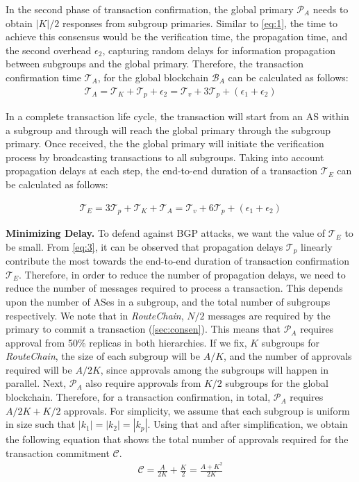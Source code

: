 \documentclass[5p]{elsarticle}
\newcommand{\BfPara}[1]{{\noindent\bf#1.}\xspace}
\newcommand{\rc}{{{\em RouteChain}}\xspace}
\begin{document}
In the second phase of transaction confirmation, the global primary $\mathcal{P}_{A}$ needs to obtain $|K|/2$ responses from subgroup primaries. Similar to \autoref{eq:1}, the time to achieve this consensus would be the verification time, the propagation time, and the second overhead $\epsilon_{2}$, capturing random delays for information propagation between subgroups and the global primary. Therefore, the transaction confirmation time $\mathcal{T}_{A}$, for the global blockchain $\mathcal{B}_{A}$ can be calculated as follows:
\begin{align}\label{eq:2}
    \mathcal{T}_{A} = \mathcal{T}_{K}+ \mathcal{T}_{p}+\epsilon_{2} = \mathcal{T}_{v} + 3\mathcal{T}_{p} + (\epsilon_{1}+\epsilon_{2})
\end{align}



In a complete transaction life cycle, the transaction will start from an AS within a subgroup and through will reach the global primary through the subgroup primary. Once received, the the global primary will initiate the verification process by broadcasting transactions to all subgroups. Taking into account propagation delays at each step, the end-to-end duration of a transaction $\mathcal{T}_{E}$ can be calculated as follows: 

\begin{align}\label{eq:3}
    \mathcal{T}_{E} = 3\mathcal{T}_{p} +\mathcal{T}_{K}+ \mathcal{T}_{A} = \mathcal{T}_{v} + 6\mathcal{T}_{p} + (\epsilon_{1}+\epsilon_{2})
\end{align}

 


\BfPara{Minimizing Delay}\label{sec:mind}
To defend against BGP attacks, we want the value of $ \mathcal{T}_{E}$ to be small. From \autoref{eq:3}, it can be observed that propagation delays  $\mathcal{T}_{p}$ linearly contribute the most towards the end-to-end duration of transaction confirmation $\mathcal{T}_{E}$. Therefore, in order to reduce the number of propagation delays, we need to reduce the number of messages required to process a transaction. This depends upon the number of ASes in a subgroup, and the total number of subgroups respectively. We note that in \rc, $N/2$ messages are required by the primary to commit a transaction (\textsection\ref{sec:consen}). This means that $\mathcal{P}_{A}$ requires approval from 50\% replicas in both hierarchies. If we fix, $K$ subgroups for \rc, the size of each subgroup will be $A/K$, and the number of approvals required will be $A/2K$, since approvals among the subgroups will happen in parallel. Next, $\mathcal{P}_{A}$ also require approvals from $K/2$ subgroups for the global blockchain. Therefore, for a transaction confirmation, in total, $\mathcal{P}_{A}$ requires $A/2K + K/2$ approvals. For simplicity, we assume that each subgroup is uniform in size such that $|k_{1}|=|k_{2}|=|k_{p}|$. Using that and after simplification, we obtain the following equation that shows the total number of approvals required for the transaction commitment $\mathcal{C}$. 
\begin{align}\label{eq:4}
\mathcal{C} = \frac{A }{2K} + \frac{K}{2}= \frac{A + K^{2}}{2K}
\end{align}
\end{document}
